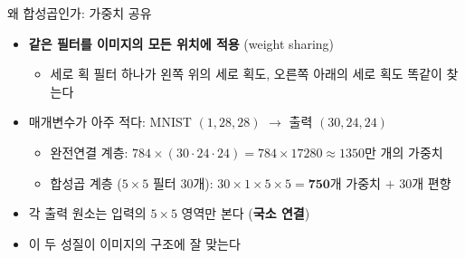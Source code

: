\documentclass[aspectratio=169,11pt]{beamer}
\begin{document}
\begin{frame}{왜 합성곱인가: 가중치 공유}
\begin{thinkbox}
\begin{itemize}
\item \textbf{같은 필터를 이미지의 모든 위치에 적용} (weight sharing)
  \begin{itemize}
  \item 세로 획 필터 하나가 왼쪽 위의 세로 획도, 오른쪽 아래의 세로 획도 똑같이 찾는다
  \end{itemize}
\item 매개변수가 아주 적다: MNIST $(1,28,28)$ $\to$ 출력 $(30,24,24)$
  \begin{itemize}
  \item 완전연결 계층: $784\times(30\cdot24\cdot24)=784\times17280\approx1350$만 개의 가중치
  \item 합성곱 계층 ($5\times5$ 필터 $30$개): $30\times1\times5\times5=\mathbf{750}$개 가중치 $+$ $30$개 편향
  \end{itemize}
\item 각 출력 원소는 입력의 $5\times5$ 영역만 본다 (\textbf{국소 연결})
\item 이 두 성질이 이미지의 구조에 잘 맞는다
\end{itemize}
\end{thinkbox}
\end{frame}
\end{document}
